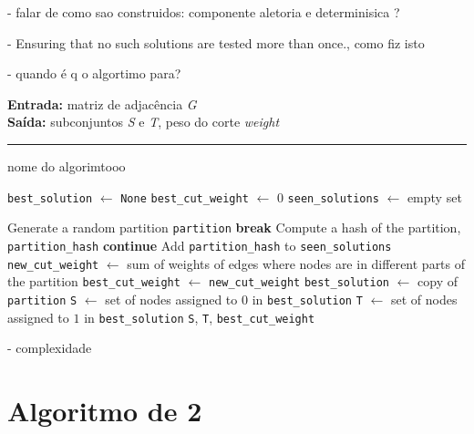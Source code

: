 \documentclass[mirror, portugues]{revdetua}
\begin{document}
- falar de como sao construidos: componente aletoria e determinisica ?

- Ensuring that no such solutions are tested more than once., como fiz isto

- quando é q o algortimo para?







\begin{algorithm}[H]
\raggedright
\textbf{Entrada:} matriz de adjacência \textit{G} \\
\textbf{Saída:} subconjuntos \textit{S} e \textit{T}, peso do corte \textit{weight} \\
\hrule 
\caption{nome do algorimtooo}
\begin{algorithmic}[1]
    \State \texttt{best\_solution} $\gets$ \texttt{None}
    \State \texttt{best\_cut\_weight} $\gets$ 0
    \State \texttt{seen\_solutions} $\gets$ empty set

        \State Generate a random partition \texttt{partition}
            \State \textbf{break}
        \EndIf
        \State Compute a hash of the partition, \texttt{partition\_hash}
            \State \textbf{continue}
        \EndIf
        \State Add \texttt{partition\_hash} to \texttt{seen\_solutions}
        \State \texttt{new\_cut\_weight} $\gets$ sum of weights of edges where nodes are in different parts of the partition
            \State \texttt{best\_cut\_weight} $\gets$ \texttt{new\_cut\_weight}
            \State \texttt{best\_solution} $\gets$ copy of \texttt{partition}
        \EndIf
    \EndFor
    \State \texttt{S} $\gets$ set of nodes assigned to $0$ in \texttt{best\_solution}
    \State \texttt{T} $\gets$ set of nodes assigned to $1$ in \texttt{best\_solution}
    \Return \texttt{S}, \texttt{T}, \texttt{best\_cut\_weight}
\end{algorithmic}
\end{algorithm}
    


- complexidade

\section{Algoritmo de 2}
\end{document}
